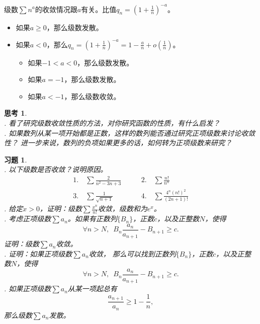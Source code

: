 \documentclass[12pt,UTF8]{ctexbook}
\newcommand{\olim}[1]{\mathit{o}\left(#1\right)}  %
\theoremstyle{definition}
\theoremstyle{plain}
\newtheorem{sk}{思考}[section]
\newtheorem{xt}{习题}[section]
\begin{document}
级数$\sum n^a$的收敛情况跟$a$有关。比值$q_n = \left(1 + \frac{1}{n}\right)^{-a}$。
\begin{itemize}
    \item 如果$a\geqslant 0$，那么级数发散。
    \item 如果$a<0$，那么$q_n = \left(1 + \frac{1}{n}\right)^{-a} = 1 - \frac{a}{n} + \olim{\frac{1}{n}}$。
    \begin{itemize}
        \item 如果$-1 < a < 0$，那么级数发散。
        \item 如果$a = -1$，那么级数发散。
        \item 如果$a < -1$，那么级数收敛。
    \end{itemize}
\end{itemize}

\begin{sk}
    \mbox{} \\
    . 看了研究级数收敛性质的方法，对你研究函数的性质，有什么启发？\\
    . 如果数列从某一项开始都是正数，这样的数列能否通过研究正项级数来讨论收敛性？
    进一步来说，数列的负项如果更多的话，如何转为正项级数来研究？
\end{sk}

\begin{xt}
    \mbox{} \\
    . 以下级数是否收敛？说明原因。
    $$
    \begin{array}{ll}
        1. \quad \sum \frac{2}{n^2 - 3n + 3} \qquad &2. \quad \sum \frac{n!}{n^n} \\
        3. \quad \sum \frac{1}{\sqrt{n + 1}} \qquad &4. \quad \sum \frac{4^n (n!)^2}{(2n + 1)!} 
    \end{array}
    $$
    . 给定$x>0$，证明：级数$\sum \frac{x^n}{n!}$收敛，级数和为$e^x$。\\
    . 考虑正项级数$\sum a_n$。如果有正数列$\{B_n\}$，正数$c$，以及正整数$N$，使得
    $$ \forall n > N, \,\,\, B_n \frac{a_n}{a_{n+1}} - B_{n+1} \geqslant c. $$
    证明：级数$\sum a_n$收敛。\\
    . 证明：如果正项级数$\sum a_n$收敛，
    那么可以找到正数列$\{B_n\}$，正数$c$，以及正整数$N$，使得
    $$ \forall n > N, \,\,\, B_n \frac{a_n}{a_{n+1}} - B_{n+1} \geqslant c. $$
    . 如果正项级数$\sum a_n$从某一项起总有
    $$ \frac{a_{n+1}}{a_n} \geqslant 1 - \frac{1}{n},$$
    那么级数$\sum a_n$发散。\\

\end{xt}
\end{document}
